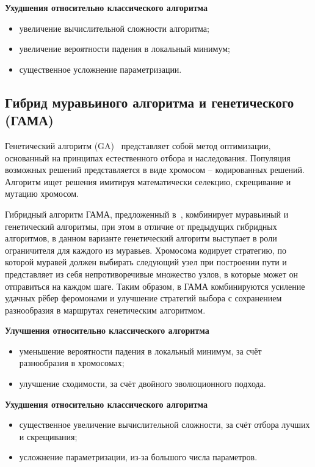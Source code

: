 \textbf{Ухудшения относительно классического алгоритма}

\begin{itemize}
	\item увеличение вычислительной сложности алгоритма;
	\item увеличение вероятности падения в локальный минимум;
	\item существенное усложнение параметризации.
\end{itemize} 

\subsection*{Гибрид муравьиного алгоритма и генетического (ГАМА)}

Генетический алгоритм (GA)~\cite{gaco} представляет собой метод оптимизации, основанный на принципах естественного отбора и наследования. Популяция возможных решений представляется в виде хромосом -- кодированных  решений. Алгоритм ищет решения имитируя математически селекцию, скрещивание и мутацию хромосом.

Гибридный алгоритм ГАМА, предложенный в~\cite{gaco}, комбинирует муравьиный и генетический алгоритмы, при этом в отличие от предыдущих гибридных алгоритмов, в данном варианте генетический алгоритм выступает в роли ограничителя для каждого из муравьев. Хромосома кодирует стратегию, по которой муравей должен выбирать следующий узел при построении пути и представляет из себя непротиворечивые множество узлов, в которые может он отправиться на каждом шаге. Таким образом, в ГАМА комбинируются усиление удачных рёбер феромонами и улучшение стратегий выбора с сохранением разнообразия в маршрутах генетическим алгоритмом.

\textbf{Улучшения относительно классического алгоритма}

\begin{itemize}
	\item уменьшение вероятности падения в локальный минимум, за счёт разнообразия в хромосомах;
	\item улучшение сходимости, за счёт двойного эволюционного подхода.
\end{itemize}

\textbf{Ухудшения относительно классического алгоритма}

\begin{itemize}
	\item существенное увеличение вычислительной сложности, за счёт отбора лучших и скрещивания;
	\item усложнение параметризации, из-за большого числа параметров.
\end{itemize} 

